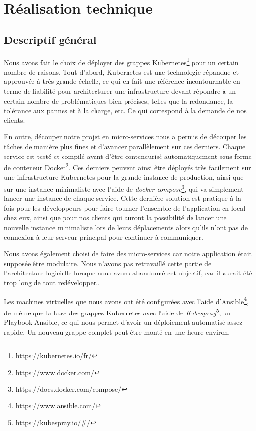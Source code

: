 \chapter{Réalisation technique}

\section{Descriptif général}

Nous avons fait le choix de déployer des grappes
Kubernetes\footnote{\url{https://kubernetes.io/fr/}}
pour un certain nombre de raisons. Tout d'abord, Kubernetes est une
technologie répandue et approuvée à très grande échelle, ce qui en fait
une référence incontournable en terme de fiabilité pour architecturer
une infrastructure devant répondre à un certain nombre de problématiques
bien précises, telles que la redondance, la tolérance aux pannes et à la
charge, etc. Ce qui correspond à la demande de nos clients.

En outre, découper notre projet en micro-services nous a permis de
découper les tâches de manière plus fines et d'avancer parallèlement sur
ces derniers. Chaque service est testé et compilé avant d'être
conteneurisé automatiquement sous forme de conteneur
Docker\footnote{\url{https://www.docker.com/}}. Ces
derniers peuvent ainsi être déployés très facilement sur une
infrastructure Kubernetes pour la grande instance de production, ainsi
que sur une instance minimaliste avec l'aide de
\textit{docker-compose}\footnote{\url{https://docs.docker.com/compose/}},
qui va simplement lancer une instance de chaque service. Cette dernière
solution est pratique à la fois pour les développeurs pour faire tourner
l'ensemble de l'application en local chez eux, ainsi que pour nos
clients qui auront la possibilité de lancer une nouvelle instance
minimaliste lors de leurs déplacements alors qu'ils n'ont pas de
connexion à leur serveur principal pour continuer à communiquer.

Nous avons également choisi de faire des micro-services car notre
application était supposée être modulaire. Nous n'avons pas retravaillé
cette partie de l'architecture logicielle lorsque nous avons abandonné
cet objectif, car il aurait été trop long de tout redévelopper..

Les machines virtuelles que nous avons ont été configurées avec l'aide
d'Ansible\footnote{\url{https://www.ansible.com/}}, de
même que la base des grappes Kubernetes avec l'aide de
\textit{Kubespray}\footnote{\url{https://kubespray.io/\#/}}, un
Playbook Ansible, ce qui nous permet d'avoir un déploiement automatisé
assez rapide. Un nouveau grappe complet peut être monté en une heure
environ.

